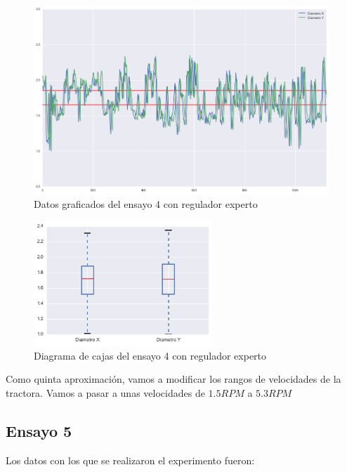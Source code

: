 \begin{figure}[H]
    \centering
    \includegraphics[width=0.99\textwidth]{images/producciones/13082015/output_9_e1.png}
    \caption{Datos graficados del ensayo 4 con regulador experto}
    \label{fig:reg_graf4}
\end{figure}

\begin{figure}[H]
    \centering
    \includegraphics[width=0.6\textwidth]{images/producciones/13082015/output_10_e1.png}
    \caption{Diagrama de cajas del ensayo 4 con regulador experto}
    \label{fig:reg_cajas4}
\end{figure}

Como quinta  aproximación, vamos a  modificar los rangos de velocidades de la tractora. Vamos a pasar a unas velocidades de $1.5RPM$ a $5.3RPM$ \\

\subsection{Ensayo 5}

Los datos con los que se realizaron el experimento fueron:

